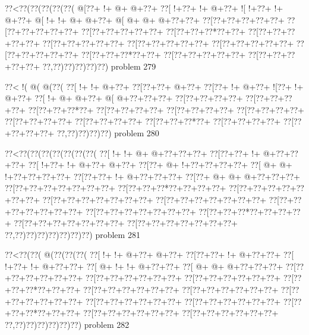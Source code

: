 \vbox{\vbox{\goo
\0??<\0??(\0??(\0??(\0??(\0??(
\- @[\0??+\- !+\- @+\- @+\0??+
\0??[\- !+\0??+\- !+\- @+\0??+
\- ![\- !+\0??+\- !+\- @+\0??+
\- @[\- !+\- !+\- @+\- @+\0??+
\- @[\- @+\- @+\- @+\0??+\0??+
\0??[\0??+\0??+\0??+\0??+\0??+
\0??[\0??+\0??+\0??+\0??+\0??+
\0??[\0??+\0??+\0??+\0??+\0??+
\0??[\0??+\0??+\0??*\0??+\0??+
\0??[\0??+\0??+\0??+\0??+\0??+
\0??[\0??+\0??+\0??+\0??+\0??+
\0??[\0??+\0??+\0??+\0??+\0??+
\0??[\0??+\0??+\0??+\0??+\0??+
\0??[\0??+\0??+\0??+\0??+\0??+
\0??[\0??+\0??+\0??*\0??+\0??+
\0??[\0??+\0??+\0??+\0??+\0??+
\0??[\0??+\0??+\0??+\0??+\0??+
\0??,\0??)\0??)\0??)\0??)\0??)
}
\hfil problem 279\hfil\break
}

\vbox{\vbox{\goo
\0??<\- !(\- @(\- @(\0??(
\0??[\- !+\- !+\- @+\0??+
\0??[\0??+\0??+\- @+\0??+
\0??[\0??+\- !+\- @+\0??+
\- ![\0??+\- !+\- @+\0??+
\0??[\- !+\- @+\- @+\0??+
\- @[\- @+\0??+\0??+\0??+
\0??[\0??+\0??+\0??+\0??+
\0??[\0??+\0??+\0??+\0??+
\0??[\0??+\0??+\0??*\0??+
\0??[\0??+\0??+\0??+\0??+
\0??[\0??+\0??+\0??+\0??+
\0??[\0??+\0??+\0??+\0??+
\0??[\0??+\0??+\0??+\0??+
\0??[\0??+\0??+\0??+\0??+
\0??[\0??+\0??+\0??*\0??+
\0??[\0??+\0??+\0??+\0??+
\0??[\0??+\0??+\0??+\0??+
\0??,\0??)\0??)\0??)\0??)
}
\hfil problem 280\hfil\break
}

\vbox{\vbox{\goo
\0??<\0??(\0??(\0??(\0??(\0??(\0??(\0??(
\0??[\- !+\- !+\- @+\- @+\0??+\0??+\0??+
\0??[\0??+\0??+\- !+\- @+\0??+\0??+\0??+
\0??[\- !+\0??+\- !+\- @+\0??+\- @+\0??+
\0??[\0??+\- @+\- !+\0??+\0??+\0??+\0??+
\0??[\- @+\- @+\- !+\0??+\0??+\0??+\0??+
\0??[\0??+\0??+\- !+\- @+\0??+\0??+\0??+
\0??[\0??+\- @+\- @+\- @+\0??+\0??+\0??+
\0??[\0??+\0??+\0??+\0??+\0??+\0??+\0??+
\0??[\0??+\0??+\0??*\0??+\0??+\0??+\0??+
\0??[\0??+\0??+\0??+\0??+\0??+\0??+\0??+
\0??[\0??+\0??+\0??+\0??+\0??+\0??+\0??+
\0??[\0??+\0??+\0??+\0??+\0??+\0??+\0??+
\0??[\0??+\0??+\0??+\0??+\0??+\0??+\0??+
\0??[\0??+\0??+\0??+\0??+\0??+\0??+\0??+
\0??[\0??+\0??+\0??*\0??+\0??+\0??+\0??+
\0??[\0??+\0??+\0??+\0??+\0??+\0??+\0??+
\0??[\0??+\0??+\0??+\0??+\0??+\0??+\0??+
\0??,\0??)\0??)\0??)\0??)\0??)\0??)\0??)
}
\hfil problem 281\hfil\break
}

\vbox{\vbox{\goo
\0??<\0??(\0??(\- @(\0??(\0??(\0??(
\0??[\- !+\- !+\- @+\0??+\- @+\0??+
\0??[\0??+\0??+\- !+\- @+\0??+\0??+
\0??[\- !+\0??+\- !+\- @+\0??+\0??+
\0??[\- @+\- !+\- !+\- @+\0??+\0??+
\0??[\- @+\- @+\- @+\0??+\0??+\0??+
\0??[\0??+\0??+\0??+\0??+\0??+\0??+
\0??[\0??+\0??+\0??+\0??+\0??+\0??+
\0??[\0??+\0??+\0??+\0??+\0??+\0??+
\0??[\0??+\0??+\0??*\0??+\0??+\0??+
\0??[\0??+\0??+\0??+\0??+\0??+\0??+
\0??[\0??+\0??+\0??+\0??+\0??+\0??+
\0??[\0??+\0??+\0??+\0??+\0??+\0??+
\0??[\0??+\0??+\0??+\0??+\0??+\0??+
\0??[\0??+\0??+\0??+\0??+\0??+\0??+
\0??[\0??+\0??+\0??*\0??+\0??+\0??+
\0??[\0??+\0??+\0??+\0??+\0??+\0??+
\0??[\0??+\0??+\0??+\0??+\0??+\0??+
\0??,\0??)\0??)\0??)\0??)\0??)\0??)
}
\hfil problem 282\hfil\break
}

